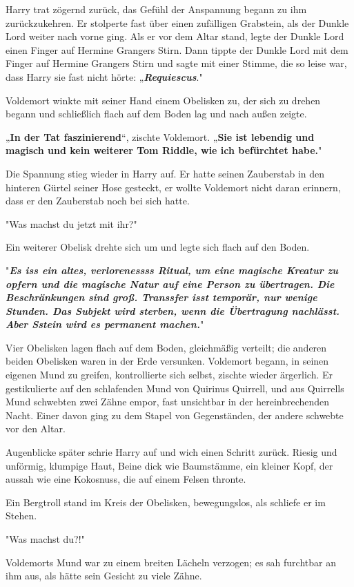 {Harry trat zögernd zurück, das Gefühl der Anspannung begann zu ihm zurückzukehren. Er stolperte fast über einen zufälligen Grabstein, als der Dunkle Lord weiter nach vorne ging. Als er vor dem Altar stand, legte der Dunkle Lord einen Finger auf Hermine Grangers Stirn. Dann tippte der Dunkle Lord mit dem Finger auf Hermine Grangers Stirn und sagte mit einer Stimme, die so leise war, dass Harry sie fast nicht hörte: „\textbf{\emph{Requiescus}}."

Voldemort winkte mit seiner Hand einem Obelisken zu, der sich zu drehen begann und schließlich flach auf dem Boden lag und nach außen zeigte.

„\textbf{In der Tat faszinierend}“, zischte Voldemort. „\textbf{Sie ist lebendig und magisch und kein weiterer Tom Riddle, wie ich befürchtet habe.}"

Die Spannung stieg wieder in Harry auf. Er hatte seinen Zauberstab in den hinteren Gürtel seiner Hose gesteckt, er wollte Voldemort nicht daran erinnern, dass er den Zauberstab noch bei sich hatte.

"Was machst du jetzt mit ihr?"

Ein weiterer Obelisk drehte sich um und legte sich flach auf den Boden.

"\textbf{\emph{Es iss ein altes, verlorenessss Ritual, um eine magische Kreatur zu opfern und die magische Natur auf eine Person zu übertragen. Die Beschränkungen sind groß. Transsfer isst temporär, nur wenige Stunden. Das Subjekt wird sterben, wenn die Übertragung nachlässt. Aber Sstein wird es permanent machen.}}"

Vier Obelisken lagen flach auf dem Boden, gleichmäßig verteilt; die anderen beiden Obelisken waren in der Erde versunken. Voldemort begann, in seinen eigenen Mund zu greifen, kontrollierte sich selbst, zischte wieder ärgerlich. Er gestikulierte auf den schlafenden Mund von Quirinus Quirrell, und aus Quirrells Mund schwebten zwei Zähne empor, fast unsichtbar in der hereinbrechenden Nacht. Einer davon ging zu dem Stapel von Gegenständen, der andere schwebte vor den Altar.

Augenblicke später schrie Harry auf und wich einen Schritt zurück. Riesig und unförmig, klumpige Haut, Beine dick wie Baumstämme, ein kleiner Kopf, der aussah wie eine Kokosnuss, die auf einem Felsen thronte.

Ein Bergtroll stand im Kreis der Obelisken, bewegungslos, als schliefe er im Stehen.

"Was machst du?!"

Voldemorts Mund war zu einem breiten Lächeln verzogen; es sah furchtbar an ihm aus, als hätte sein Gesicht zu viele Zähne.

}
